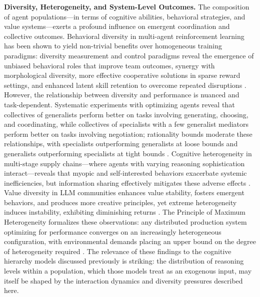 \documentclass[11pt]{article}
\begin{document}
\textbf{Diversity, Heterogeneity, and System-Level Outcomes.} The composition of agent populations---in terms of cognitive abilities, behavioral strategies, and value systems---exerts a profound influence on emergent coordination and collective outcomes. Behavioral diversity in multi-agent reinforcement learning has been shown to yield non-trivial benefits over homogeneous training paradigms: diversity measurement and control paradigms reveal the emergence of unbiased behavioral roles that improve team outcomes, synergy with morphological diversity, more effective cooperative solutions in sparse reward settings, and enhanced latent skill retention to overcome repeated disruptions \cite{ref252}. However, the relationship between diversity and performance is nuanced and task-dependent. Systematic experiments with optimizing agents reveal that collectives of generalists perform better on tasks involving generating, choosing, and coordinating, while collectives of specialists with a few generalist mediators perform better on tasks involving negotiation; rationality bounds moderate these relationships, with specialists outperforming generalists at loose bounds and generalists outperforming specialists at tight bounds \cite{ref253}. Cognitive heterogeneity in multi-stage supply chains---where agents with varying reasoning sophistication interact---reveals that myopic and self-interested behaviors exacerbate systemic inefficiencies, but information sharing effectively mitigates these adverse effects \cite{ref254}. Value diversity in LLM communities enhances value stability, fosters emergent behaviors, and produces more creative principles, yet extreme heterogeneity induces instability, exhibiting diminishing returns \cite{ref255}. The Principle of Maximum Heterogeneity formalizes these observations: any distributed production system optimizing for performance converges on an increasingly heterogeneous configuration, with environmental demands placing an upper bound on the degree of heterogeneity required \cite{ref256}. The relevance of these findings to the cognitive hierarchy models discussed previously is striking: the distribution of reasoning levels within a population, which those models treat as an exogenous input, may itself be shaped by the interaction dynamics and diversity pressures described here.
\end{document}
